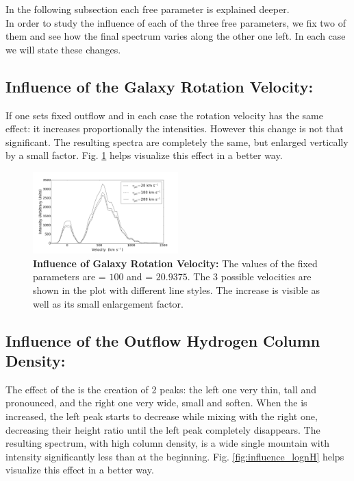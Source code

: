 \documentclass{latex/emulateapj}
\begin{document}
In the following subsection each free parameter is explained deeper. \\

In order to study the influence of each of the three free parameters, we fix two of them and see how the final spectrum varies along the other one left. In each case we will state these changes.\\

\subsection{Influence of the Galaxy Rotation Velocity: \vgal}

If one sets fixed outflow \vout and \lognh in each case the rotation velocity has the same effect: it increases proportionally the intensities. However this change is not that significant. The resulting spectra are completely the same, but enlarged vertically by a small factor. Fig. \ref{fig:influence_vgal} helps visualize this effect in a better way.\\

\begin{figure}[h!]
\begin{center}
  \includegraphics[width=0.5\textwidth]{./figures/inf_vgal_soft.png}
\end{center}
\caption{\textbf{Influence of Galaxy Rotation Velocity:} The values of the fixed parameters are \vout = $100$ \kms and \lognh = $20.9375$. The 3 possible velocities are shown in the plot with different line styles. The increase is visible as well as its small enlargement factor.\\
\label{fig:influence_vgal}}
\end{figure}

\subsection{Influence of the Outflow Hydrogen Column Density: \lognh }

The effect of the \lognh is the creation of 2 peaks: the left one very thin, tall and pronounced, and the right one very wide, small and soften. When the \lognh is increased, the left peak starts to decrease while mixing with the right one, decreasing their height ratio until the left peak completely disappears. The resulting spectrum, with high column density, is a wide single mountain with intensity significantly less than at the beginning. Fig. \ref{fig:influence_lognH} helps visualize this effect in a better way.\\
\end{document}
